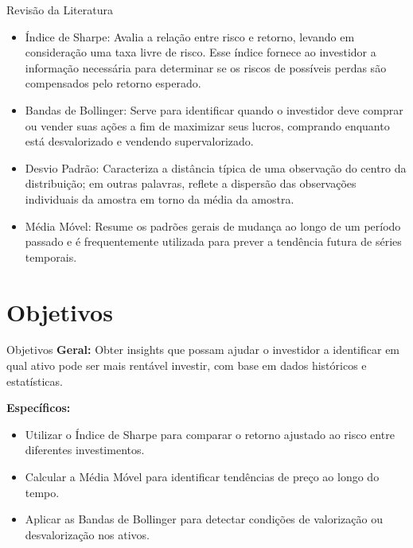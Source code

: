 \documentclass[aspectratio=169]{beamer}
\begin{document}
\begin{frame}{Revisão da Literatura}
  \begin{itemize}
    \item Índice de Sharpe: Avalia a relação entre risco e retorno, levando em consideração uma taxa livre de risco. Esse índice fornece ao investidor a informação necessária para determinar se os riscos de possíveis perdas são compensados pelo retorno esperado. \cite{de2015fundos}

    \item Bandas de Bollinger: Serve para identificar quando o investidor deve comprar ou vender suas ações a fim de maximizar seus lucros, comprando enquanto está desvalorizado e vendendo supervalorizado. \cite{yan2023enhanced}

    \item Desvio Padrão: Caracteriza a distância típica de uma observação do centro da distribuição; em outras palavras, reflete a dispersão das observações individuais da amostra em torno da média da amostra. \cite{curran1998fundamental}

    \item Média Móvel: Resume os padrões gerais de mudança ao longo de um período passado e é frequentemente utilizada para prever a tendência futura de séries temporais. \cite{su2022self}

  \end{itemize}
\end{frame}

\section{Objetivos}
\begin{frame}{Objetivos}
  \textbf{Geral:}
  Obter insights que possam ajudar o investidor a identificar em qual ativo pode ser mais rentável investir, com base em dados históricos e estatísticas.

  \vspace{0.5cm}
  \textbf{Específicos:}
  \begin{itemize}
    \item Utilizar o Índice de Sharpe para comparar o retorno ajustado ao risco entre diferentes investimentos.
    \item Calcular a Média Móvel para identificar tendências de preço ao longo do tempo.
    \item Aplicar as Bandas de Bollinger para detectar condições de valorização ou desvalorização nos ativos.
  \end{itemize}
\end{frame}
\end{document}
